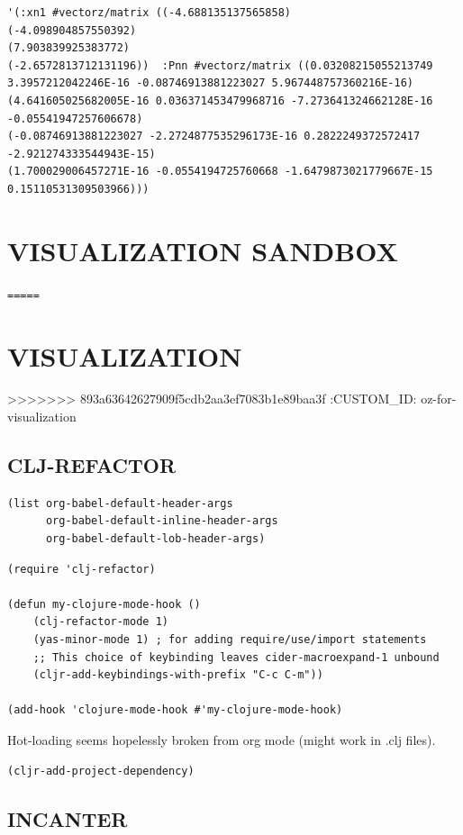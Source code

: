 \documentclass[10pt,oneside,x11names]{article}
\begin{document}
\begin{verbatim}
'(:xn1 #vectorz/matrix ((-4.688135137565858)
(-4.098904857550392)
(7.903839925383772)
(-2.6572813712131196))  :Pnn #vectorz/matrix ((0.03208215055213749 3.3957212042246E-16 -0.08746913881223027 5.967448757360216E-16)
(4.641605025682005E-16 0.036371453479968716 -7.273641324662128E-16 -0.05541947257606678)
(-0.08746913881223027 -2.2724877535296173E-16 0.2822249372572417 -2.921274333544943E-15)
(1.700029006457271E-16 -0.0554194725760668 -1.6479873021779667E-15 0.15110531309503966)))
\end{verbatim}

\section{VISUALIZATION SANDBOX}
\label{sec:orgd2731a3}
\texttt{=====}
\section{VISUALIZATION}
\label{sec:org09c3948}
>>>>>>> 893a63642627909f5cdb2aa3ef7083b1e89baa3f
:CUSTOM\_ID: oz-for-visualization

\subsection{CLJ-REFACTOR}
\label{sec:orgaa37599}

\begin{verbatim}
(list org-babel-default-header-args
      org-babel-default-inline-header-args
      org-babel-default-lob-header-args)
\end{verbatim}

\begin{verbatim}
(require 'clj-refactor)

(defun my-clojure-mode-hook ()
    (clj-refactor-mode 1)
    (yas-minor-mode 1) ; for adding require/use/import statements
    ;; This choice of keybinding leaves cider-macroexpand-1 unbound
    (cljr-add-keybindings-with-prefix "C-c C-m"))

(add-hook 'clojure-mode-hook #'my-clojure-mode-hook)
\end{verbatim}

Hot-loading seems hopelessly broken from org mode (might work in .clj files).

\begin{verbatim}
(cljr-add-project-dependency)
\end{verbatim}

\subsection{INCANTER}
\label{sec:org2e4d4ec}
\end{document}
